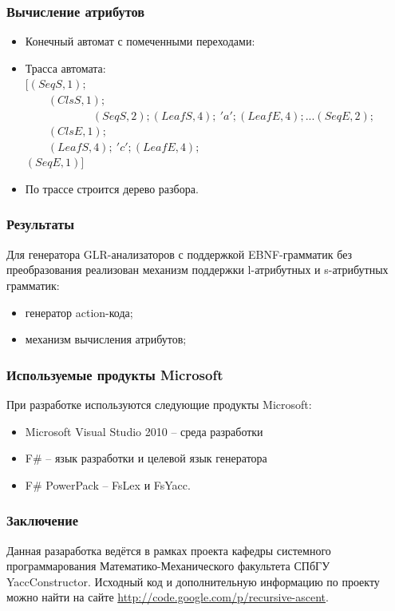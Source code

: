 \documentclass{beamer}
\begin{document}
\begin{frame}
	\transwipe[direction=90]
	\frametitle{Вычисление атрибутов}
  \begin{itemize}
   \item
    Конечный автомат с помеченными переходами:\\
    
   \item
    Трасса автомата: \\
    $[(SeqS,1);$\\             
    $\phantom \qquad(ClsS,1);$\\
    $\phantom \qquad \qquad \qquad (SeqS,2); (LeafS,4); \ 'a'; (LeafE,4); ... (SeqE,2);$ \\ 
    $\phantom \qquad (ClsE,1); $\\
    $\phantom \qquad (LeafS,4); \ 'c'; (LeafE,4);$\\
    $(SeqE,1)]$
   \item
    По трассе строится дерево разбора.
  \end{itemize}
\end{frame}

\begin{frame}
	\transwipe[direction=90]
	\frametitle{Результаты}
	Для генератора GLR-анализаторов с поддержкой EBNF-грамматик без преобразования реализован механизм поддержки l-атрибутных и s-атрибутных грамматик:
	\begin{itemize}
		\item генератор action-кода;
        \item механизм вычисления атрибутов;
	\end{itemize}	
\end{frame}


\begin{frame}
	\transwipe[direction=90]
	\frametitle{Используемые продукты Microsoft}
	 При разработке используются следующие продукты Microsoft:
	\begin{itemize}
		\item Microsoft Visual Studio 2010 -- среда разработки
		\item F\# -- язык разработки и целевой язык генератора
        \item F\# PowerPack -- FsLex и FsYacc.
	\end{itemize}	
\end{frame}

\begin{frame}
	\transwipe[direction=90]
	\frametitle{Заключение}
        Данная разаработка ведётся в рамках проекта кафедры системного программарования Математико-Механического факультета СПбГУ YaccConstructor. Исходный код и дополнительную информацию по проекту можно найти на сайте \href{http://code.google.com/p/recursive-ascent/}{http://code.google.com/p/recursive-ascent}.

\end{frame}
\end{document}
